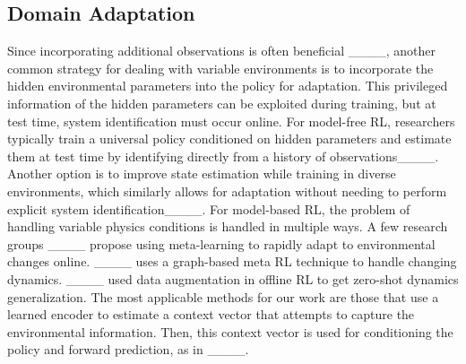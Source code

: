 \subsection{Domain Adaptation}
Since incorporating additional observations is often beneficial ____, another common strategy for dealing with variable environments is to incorporate the hidden environmental parameters into the policy for adaptation. This privileged information of the hidden parameters can be exploited during training, but at test time, system identification must occur online. For model-free RL, researchers typically train a universal policy conditioned on hidden parameters and estimate them at test time by identifying directly from a history of observations____. Another option is to improve state estimation while training in diverse environments, which similarly allows for adaptation without needing to perform explicit system identification____. 
For model-based RL, the problem of handling variable physics conditions is handled in multiple ways. A few research groups ____ propose using meta-learning to rapidly adapt to environmental changes online. ____ uses a graph-based meta RL technique to handle changing dynamics. ____ used data augmentation in offline RL to get zero-shot dynamics generalization. The most applicable methods for our work are those that use a learned encoder to estimate a context vector that attempts to capture the environmental information. Then, this context vector is used for conditioning the policy and forward prediction, as in ____.



